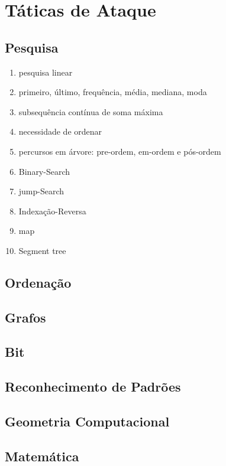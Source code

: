 \chapter{Táticas de Ataque}
\section*{Pesquisa}
\begin{enumerate}
	\item{pesquisa linear}
	\item{primeiro, último, frequência, média, mediana, moda} 
	\item subsequência contínua de soma máxima
	\item necessidade de ordenar
	\item percursos em árvore: pre-ordem, em-ordem e pós-ordem
	\item Binary-Search
	\item jump-Search
	\item Indexação-Reversa
	\item map
	\item Segment tree
\end{enumerate}

\section*{Ordenação}
\section*{Grafos}
\section*{Bit}
\section*{Reconhecimento de Padrões}
\section*{Geometria Computacional}
\section*{Matemática}